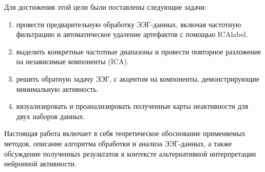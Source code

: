 Для достижения этой цели были поставлены следующие задачи:

\begin{enumerate}
    \item провести предварительную обработку ЭЭГ-данных, включая частотную фильтрацию и автоматическое удаление артефактов с помощью ICAlabel.
    \item выделить конкретные частотные диапазоны и провести повторное разложение на независимые компоненты (ICA).
    \item решить обратную задачу ЭЭГ, с акцентом на компоненты, демонстрирующие минимальную активность.
    \item визуализировать и проанализировать полученные карты неактивности для двух наборов данных.
\end{enumerate}

Настоящая работа включает в себя теоретическое обоснование применяемых методов, описание алгоритма обработки и анализа ЭЭГ-данных, а также обсуждение полученных результатов в контексте альтернативной интерпретации нейронной активности.

\endinput


